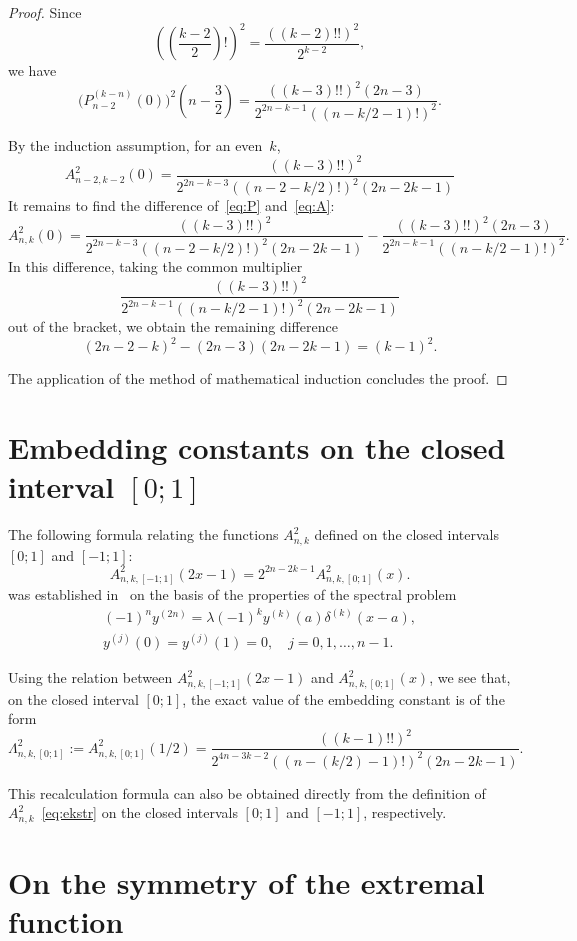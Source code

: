 \documentclass[12pt,oneside]{amsproc}
\numberwithin{equation}{section}
\begin{document}
\begin{proof}
 Since
$$
\left(\left(\frac{k-2}{2}\right)!\right)^2=\dfrac{((k-2)!!)^2}{2^{k-2}},
$$
we have
\begin{equation}
\label{eq:P}
\bigl(P_{n-2}^{(k-n)}(0)\bigr)^2\left(n-\frac32\right)=\dfrac{((k-3)!!)^2(2n-3)}{2^{2n-k-1
}((n-k/2-1)!)^2}.
\end{equation}

 By the induction assumption,
for an even~$k$,
\begin{equation}
\label{eq:A}
A_{n-2,k-2}^2(0)=\dfrac{((k-3)!!)^2}{2^{2n-k-3}((n-2-k/2)!)^2(2n-2k-1)}
\end{equation}
 It remains to find the difference of~\eqref{eq:P}
and~\eqref{eq:A}:
$$
A_{n,k}^2(0)=\dfrac{((k-3)!!)^2}{2^{2n-k-3}((n-2-k/2)!)^2(2n-2k-1)}-\dfrac{((k-3)!!)^2(2n-
3)}{2^{2n-k-1}((n-k/2-1)!)^2}.
$$
 In this difference,
taking the common multiplier
$$
\dfrac{((k-3)!!)^2}{2^{2n-k-1}((n-k/2-1)!)^2(2n-2k-1)}
$$
out of the bracket,
we obtain the remaining difference
$$
(2n-2-k)^2-(2n-3)(2n-2k-1)=(k-1)^2.
$$

 The application of the method of mathematical induction
concludes the proof.
\end{proof}

\section{Embedding constants on the closed interval $[0;1]$}
 The following formula
relating the functions
$A^2_{n,k}$
defined on the closed intervals
$[0;1]$
and
$[-1;1]$:
$$
A^2_{n,k,[-1;1]}(2x-1)=2^{2n-2k-1}A^2_{n,k,[0;1]}(x).
$$
was established in~\cite{GarmSh}
on the basis of the properties of the spectral problem
\begin{gather}
\label{eq:krzad}
(-1)^ny^{(2n)}=\lambda (-1)^k y^{(k)}(a)\delta^{(k)}(x-a),\\
y^{(j)}(0)=y^{(j)}(1)=0,\quad j=0,1,\ldots,n-1.
\end{gather}

 Using the relation between $A^2_{n,k,[-1;1]}(2x-1)$ and $A^2_{n,k,[0;1]}(x)$,
we see that,
on the closed interval
$[0;1]$,
the exact value of the embedding constant
is of the form
$$
\Lambda^2_{n,k,[0;1]}:=A^2_{n,k,[0;1]}(1/2)=\dfrac{((k-1)!!)^2}{2^{4n-3k-2}((n-(k/2)-1)!)^
2(2n-2k-1)}.
$$

 This recalculation formula
can also be obtained
directly from the definition of~$A^2_{n,k}$~\eqref{eq:ekstr}
on the closed intervals
$[0;1]$
and
$[-1;1]$,
respectively.

\section{On the symmetry of the extremal function}
\end{document}
